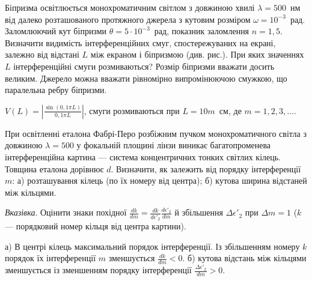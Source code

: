\begin{problem}%
Біпризма освітлюється монохроматичним світлом з довжиною хвилі $ \lambda = 500 $~нм від далеко розташованого протяжного джерела з кутовим розміром $\omega = 10^{-3}$~рад. Заломлюючий кут біпризми $ \theta = 5\cdot10^{-3} $~рад, показник заломлення $ n = 1,5 $. Визначити видимість інтерференційних смуг, спостережуваних на екрані, залежно від відстані $  L $ між екраном і біпризмою (див. рис.). При яких значеннях $ L $ інтерференційні смуги розмиваються? Розмір біпризми вважати досить великим. Джерело можна вважати рівномірно випромінюючою смужкою, що паралельна ребру біпризми.

\begin{center}
	
\end{center}

\begin{solution}
	$V(L) = \left| \frac{\sin(0,1\pi L)}{0,1\pi L}\right|$, смуги розмиваються при $L = 10m$~см, де $m = 1, 2, 3, \ldots$.
\end{solution}
\end{problem}



\begin{problem}%
При освітленні еталона Фабрі-Перо розбіжним пучком
монохроматичного світла з довжиною  $ \lambda
	= 500 $ у фокальній площині лінзи виникає
багатопроменева інтерференційна картина --- система концентричних
тонких світлих кілець. Товщина еталона дорівнює $ d $. Визначити, як
залежить від порядку інтерференції $ m $: а) розташування кілець (по їх
номеру від центра); б) кутова ширина відстаней між кільцями.

\medskip

\emph{Вказівка}. Оцінити знаки похідної $ \frac{dk}{dm} = \frac{dk}{d\epsilon'_2} \frac{d\epsilon'_2}{dm}$ й збільшення $\Delta \epsilon'_2$ при
$ \Delta m = 1 $ ($ k $ --- порядковий номер кільця від центра картини).
\begin{solution}
	а) В центрі кілець максимальний порядок інтерференції. Із збільшенням номеру
	$k$ порядок їх інтерференції $ m $ зменшується $\frac{dk}{dm} < 0$. б) кутова відстань між кільцями зменшується із зменшенням порядку інтерференції  $\frac{\Delta \epsilon'_2}{dm} > 0 $.
\end{solution}
\end{problem}



